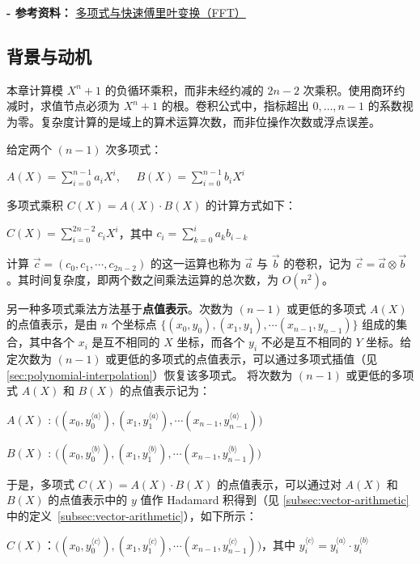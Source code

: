 \textbf{- 参考资料：}
\href{http://web.cecs.pdx.edu/~maier/cs584/Lectures/lect07b-11-MG.pdf}{多项式与快速傅里叶变换（FFT）}~\cite{ntt}

\subsection{背景与动机}
\label{subsec:ntt-motivation}

本章计算模 $X^n+1$ 的负循环乘积，而非未经约减的 $2n-2$ 次乘积。使用商环约减时，求值节点必须为 $X^n+1$ 的根。卷积公式中，指标超出 $0,\ldots,n-1$ 的系数视为零。复杂度计算的是域上的算术运算次数，而非位操作次数或浮点误差。

给定两个 $(n-1)$ 次多项式：

$A(X) = \sum\limits_{i=0}^{n-1}a_iX^i$, \textcolor{white}{...} $B(X) = \sum\limits_{i=0}^{n-1}b_iX^i$

多项式乘积 $C(X) = A(X)\cdot B(X)$ 的计算方式如下：

$C(X) = \sum\limits_{i=0}^{2n-2}c_iX^{i}$，其中 $c_i = \sum\limits_{k=0}^{i}a_kb_{i-k}$

计算 $\vec{c} = (c_0, c_1, \cdots, c_{2n-2})$ 的这一运算也称为 $\vec a$ 与 $\vec b$ 的卷积，记为 $\vec{c} = \vec{a} \otimes \vec{b}$。其时间复杂度，即两个数之间乘法运算的总次数，为 $O(n^2)$。

另一种多项式乘法方法基于\textbf{点值表示}。次数为 $(n-1)$ 或更低的多项式 $A(X)$ 的点值表示，是由 $n$ 个坐标点 $\{(x_0, y_0), (x_1, y_1), \cdots (x_{n-1}, y_{n-1})\}$ 组成的集合，其中各个 $x_i$ 是互不相同的 $X$ 坐标，而各个 $y_i$ 不必是互不相同的 $Y$ 坐标。给定次数为 $(n-1)$ 或更低的多项式的点值表示，可以通过多项式插值（见 \autoref{sec:polynomial-interpolation}）恢复该多项式。
将次数为 $(n-1)$ 或更低的多项式 $A(X)$ 和 $B(X)$ 的点值表示记为：

$A(X)$ : $\bm ( ({x}_0, {y}_0^{\langle a \rangle}), ({x}_1, {y}_1^{\langle a \rangle}), \cdots ({x}_{n-1}, {y}_{n-1}^{\langle a \rangle}) \bm )$

$B(X)$ : $\bm ( ({x}_0, {y}_0^{\langle b \rangle}), ({x}_1, {y}_1^{\langle b \rangle}), \cdots ({x}_{n-1}, {y}_{n-1}^{\langle b \rangle}) \bm )$


于是，多项式 $C(X) = A(X) \cdot B(X)$ 的点值表示，可以通过对 $A(X)$ 和 $B(X)$ 的点值表示中的 $y$ 值作 Hadamard 积得到（见 \autoref{subsec:vector-arithmetic} 中的定义~\ref*{subsec:vector-arithmetic}），如下所示：

$C(X)$：$\bm ( ({x}_0, {y}_0^{\langle c \rangle}), ({x}_1, {y}_1^{\langle c \rangle}), \cdots ({x}_{n-1}, {y}_{n-1}^{\langle c \rangle}) \bm )$，其中 ${y}_i^{\langle c \rangle} = {y}_i^{\langle a \rangle} \cdot {y}_i^{\langle b \rangle}$


